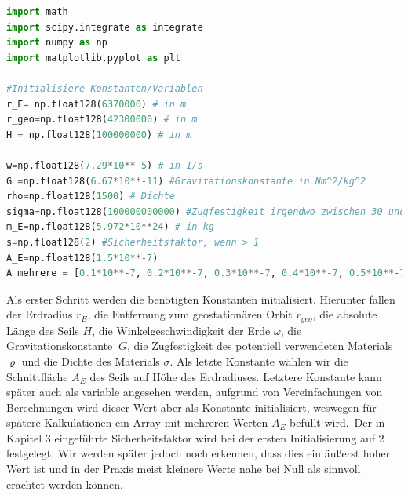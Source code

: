 \documentclass[a4paper, 10pt]{report}
\begin{document}
\lstset{style=mystyle}
\begin{lstlisting}[language=Python, caption=Python Variableninitialisierung]
import math
import scipy.integrate as integrate
import numpy as np
import matplotlib.pyplot as plt

#Initialisiere Konstanten/Variablen
r_E= np.float128(6370000) # in m
r_geo=np.float128(42300000) # in m
H = np.float128(100000000) # in m

w=np.float128(7.29*10**-5) # in 1/s
G =np.float128(6.67*10**-11) #Gravitationskonstante in Nm^2/kg^2
rho=np.float128(1500) # Dichte
sigma=np.float128(100000000000) #Zugfestigkeit irgendwo zwischen 30 und 130 GPa
m_E=np.float128(5.972*10**24) # in kg
s=np.float128(2) #Sicherheitsfaktor, wenn > 1
A_E=np.float128(1.5*10**-7)
A_mehrere = [0.1*10**-7, 0.2*10**-7, 0.3*10**-7, 0.4*10**-7, 0.5*10**-7, 1*10**-7, 1.5*10**-7, 3*10**-7, 10*10**-7, 20*10**-7]

\end{lstlisting}
Als erster Schritt werden die benötigten Konstanten initialisiert. Hierunter fallen der Erdradius \( r_E \), die Entfernung zum geostationären Orbit \( r_{geo} \), die absolute Länge des Seils \( H \), die Winkelgeschwindigkeit der Erde \(\omega \), die Gravitationskonstante \(\ G \), die Zugfestigkeit des potentiell verwendeten Materials \(\varrho \) und die Dichte des Materials \(\sigma \). Als letzte Konstante wählen wir die Schnittfläche \( A_E \) des Seils auf Höhe des Erdradiuses. Letztere Konstante kann später auch als variable angesehen werden, aufgrund von Vereinfachungen von Berechnungen wird dieser Wert aber als Konstante initialisiert, weswegen für spätere Kalkulationen ein Array mit mehreren Werten \( A_E \) befüllt wird.\
Der in Kapitel 3 eingeführte Sicherheitsfaktor wird bei der ersten Initialisierung auf 2 festgelegt. Wir werden später jedoch noch erkennen, dass dies ein äußerst hoher Wert ist und in der Praxis meist kleinere Werte nahe bei Null als sinnvoll erachtet werden können.
\end{document}

